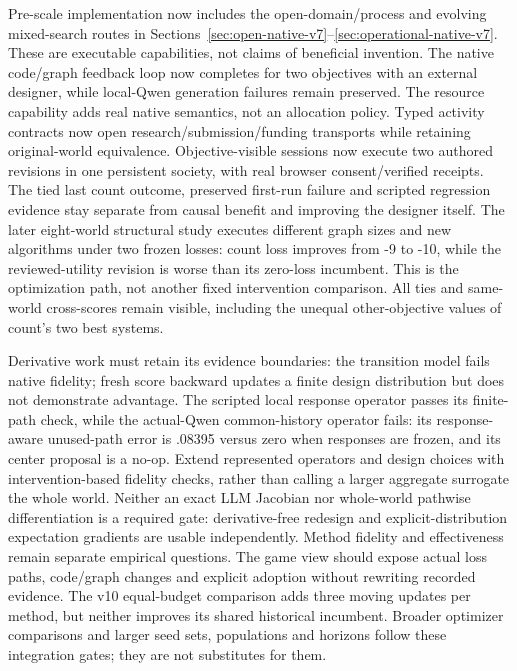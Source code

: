 \documentclass{article}
\begin{document}
Pre-scale implementation now includes the open-domain/process and evolving
mixed-search routes in Sections~\ref{sec:open-native-v7}--\ref{sec:operational-native-v7}.
These are executable capabilities, not claims of beneficial invention. The native
code/graph feedback loop now completes for two objectives with an external
designer, while local-Qwen generation failures remain preserved. The resource
capability adds real native semantics, not an allocation policy. Typed activity
contracts now open research/submission/funding transports while retaining
original-world equivalence. Objective-visible sessions now execute two authored
revisions in one persistent society, with real browser consent/verified receipts.
The tied last count outcome, preserved first-run failure and scripted regression
evidence stay separate from causal benefit and improving the designer itself.
The later eight-world structural study executes different graph sizes and new
algorithms under two frozen losses: count loss improves from -9 to -10, while the
reviewed-utility revision is worse than its zero-loss incumbent. This is the
optimization path, not another fixed intervention comparison. All ties and
same-world cross-scores remain visible, including the unequal other-objective
values of count's two best systems.

Derivative work must retain its evidence boundaries: the transition model fails
native fidelity; fresh score backward updates a finite design distribution but
does not demonstrate advantage. The scripted local response operator passes its
finite-path check, while the actual-Qwen common-history operator fails: its
response-aware unused-path error is .08395 versus zero when responses are
frozen, and its center proposal is a no-op. Extend represented operators and
design choices with intervention-based fidelity checks, rather than calling a
larger aggregate surrogate the whole world.
Neither an exact LLM Jacobian nor whole-world pathwise differentiation is a
required gate: derivative-free redesign and explicit-distribution expectation
gradients are usable independently. Method fidelity and effectiveness remain
separate empirical questions.
The game view should expose actual loss paths,
code/graph changes and explicit adoption without rewriting recorded evidence.
The v10 equal-budget comparison adds three moving updates per method, but
neither improves its shared historical incumbent. Broader optimizer comparisons
and larger seed sets, populations and horizons follow these integration gates;
they are not substitutes for them.
\end{document}
